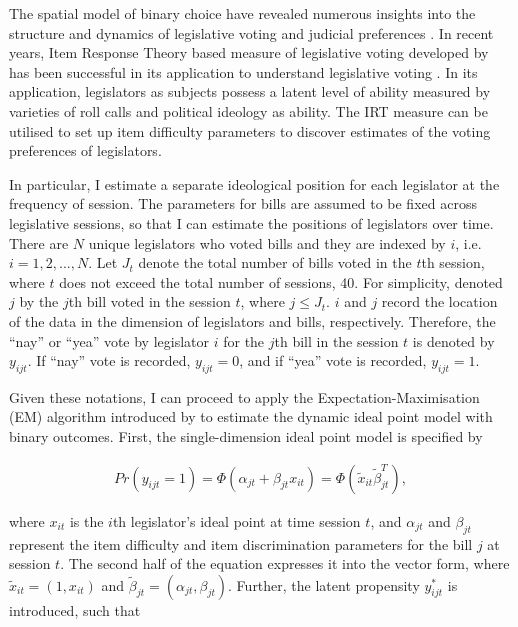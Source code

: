 The spatial model of binary choice have revealed numerous insights into the structure and dynamics of legislative voting \citep[][]{Carroll2013,Clinton2004,Cox2002b, McCarty2001,McCarty2006,Snyder2001,Poole1997,Poole2007,Jackman2001,Tsai2020,Gray2019} and judicial preferences \citep[][]{Epstein2007,Martin2002,Martin2007}. In recent years, Item Response Theory based measure of legislative voting developed by \textcite{Clinton2004} has been successful in its application to understand legislative voting \citep[e.g.][]{Zucco2011, Tsai2020, Gray2019}. In its application, legislators as subjects possess a latent level of ability measured by varieties of roll calls and political ideology as ability. The IRT measure can be utilised to set up item difficulty parameters to discover estimates of the voting preferences of legislators.

In particular, I estimate a separate ideological position for each legislator at the frequency of session. The parameters for bills are assumed to be fixed across legislative sessions, so that I can estimate the positions of legislators over time. There are $N$ unique legislators who voted bills and they are indexed by $i$, i.e. $i=1,2,...,N$. Let $J_{t}$ denote the total number of bills voted in the $t$th session, where $t$ does not exceed the total number of sessions, 40. For simplicity, denoted $j$ by the $j$th bill voted in the session $t$, where $j\leq J_{t}$. $i$ and $j$ record the location of the data in the dimension of legislators and bills, respectively. Therefore, the ``nay'' or ``yea'' vote by legislator $i$ for the $j$th bill in the session $t$ is denoted by $y_{ijt}$. If ``nay'' vote is recorded, $y_{ijt}=0$, and if ``yea'' vote is recorded, $y_{ijt}=1$. 

Given these notations, I can proceed to apply the Expectation-Maximisation (EM) algorithm introduced by \citet{Imai2016} to estimate the dynamic ideal point model with binary outcomes. First, the single-dimension ideal point model is specified by

\begin{equation}
\begin{aligned}
Pr(y_{ijt}=1)=\Phi(\alpha_{jt}+\beta_{jt}x_{it})=\Phi(\tilde{x}_{it}\tilde{\beta}_{jt}^{T}),
\end{aligned}
\end{equation}

\noindent where $x_{it}$ is the $i$th legislator's ideal point at time session $t$, and $\alpha_{jt}$ and $\beta_{jt}$ represent the item difficulty and item discrimination parameters for the bill $j$ at session $t$. The second half of the equation expresses it into the vector form, where $\tilde{x}_{it}=(1,x_{it})$ and $\tilde{\beta}_{jt}=(\alpha_{jt},\beta_{jt})$. Further, the latent propensity $y_{ijt}^{*}$ is introduced, such that 

